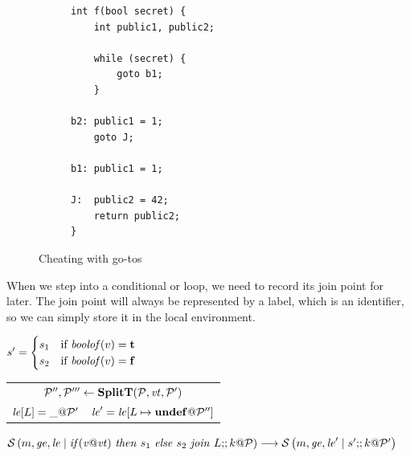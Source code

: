 \documentclass{article}
\begin{document}
\begin{figure}
  \begin{subfigure}{0.3\textwidth}
\begin{verbatim}
int f(bool secret) {
    int public1, public2;

    while (secret) {
        goto b1;
    }

b2: public1 = 1;
    goto J;

b1: public1 = 1;

J:  public2 = 42;
    return public2;
}
\end{verbatim}
  \end{subfigure}
  \begin{subfigure}{0.5\textwidth}
  \end{subfigure}
  
  \caption{Cheating with go-tos}
  \label{fig:forbreak}
\end{figure}

When we step into a conditional or loop, we need to record its join point for later.
The join point will always be represented by a label, which is an identifier,
so we can simply store it in the local environment.

\judgmenttwo
    {\(s' =
      \begin{cases}
        s_1 & \textnormal{if } \mathit{boolof}(v) = \mathbf{t} \\
        s_2 & \textnormal{if } \mathit{boolof}(v) = \mathbf{f} \\
      \end{cases}\)}
    {\begin{tabular}{l r}
      \multicolumn{2}{c}{\(\mathcal{P}'',\mathcal{P}''' \leftarrow \mathbf{SplitT}(\mathcal{P},\mathit{vt},\mathcal{P}') \)} \\
      \(\mathit{le}[L] = \mathit{\_} @ \mathcal{P}'\) & \(\mathit{le}' = \mathit{le}[L \mapsto \mathit{\mathbf{undef}} @ \mathcal{P}'']\) \\
      \end{tabular}}
            {\(\mathcal{S}\left(m,\mathit{ge},\mathit{le} \mid \mathit{if}(\mathit{v} @ \mathit{vt}) ~ \mathit{then} ~ s_1 ~ \mathit{else} ~ s_2 ~ \mathit{join} ~ L ;\!; k @ \mathcal{P}\right) \longrightarrow
              \mathcal{S}\left(m,\mathit{ge},\mathit{le}' \mid s' ;\!; k @ \mathcal{P}'\right)\)}
\end{document}

